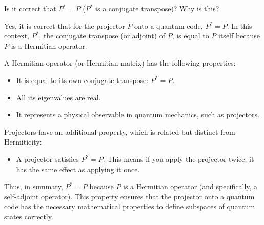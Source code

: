 \begin{ai}
Is it correct that $P^* = P$ ($P^*$ is a conjugate transpose)? Why is this?
\end{ai}

\begin{airesult}
Yes, it is correct that for the projector $P$ onto a quantum code, $P^* = P$. In this context,
$P^*$, the conjugate transpose (or adjoint) of $P$, is equal to $P$ itself because $P$ is a
Hermitian operator.

\vsp

A Hermitian operator (or Hermitian matrix) has the following properties:

\begin{itemize}
  \item It is equal to its own conjugate transpose: \( P^* = P \).
  \item All its eigenvalues are real.
  \item It represents a physical observable in quantum mechanics, such as projectors.
\end{itemize}

\vsp

Projectors have an additional property, which is related but distinct from Hermiticity:

\begin{itemize}
  \item A projector satisfies \( P^2 = P \). This means if you apply the projector twice, it has the
same effect as applying it once.
\end{itemize}

\vsp

Thus, in summary, $P^* = P$ because $P$ is a Hermitian operator (and specifically, a self-adjoint
operator). This property ensures that the projector onto a quantum code has the necessary
mathematical properties to define subspaces of quantum states correctly.
\end{airesult}

